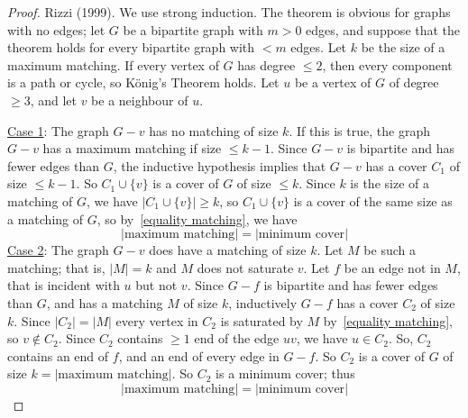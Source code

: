 \begin{proof}
    Rizzi (1999). We use strong induction.
    The theorem is obvious for graphs with no edges; let $ G $
    be a bipartite graph with $ m>0 $ edges, and suppose that the theorem holds
    for every bipartite graph with $ <m $ edges. Let $ k $ be the size of a
    maximum matching. If every vertex of $ G $ has degree $ \leqslant 2 $, then every
    component is a path or cycle, so König's Theorem holds. Let $ u $ be a vertex of
    $ G $ of degree $ \geqslant 3 $, and let $ v $ be a neighbour of $ u $.

    \underline{Case 1}: The graph $ G-v $ has no matching of size $ k $. If this is true,
    the graph $ G-v $ has a maximum matching if size $ \leqslant k-1 $. Since $ G-v $
    is bipartite and has fewer edges than $ G $, the inductive hypothesis implies that
    $ G-v $ has a cover $ C_1 $ of size $ \leqslant k-1 $. So $ C_1\cup \{v\} $
    is a cover of $ G $ of size $ \leqslant k $. Since $ k $ is the size of a matching of
    $ G $, we have $ |C_1\cup \{v\}|\geqslant k $, so $ C_1 \cup \{v\} $ is a cover
    of the same size as a matching of $ G $, so by~\ref{equality matching},
    we have
    \[ |\text{maximum matching}|=|\text{minimum cover}| \]
    \underline{Case 2}: The graph $ G-v $ does have a matching of size $ k $. Let
    $ M $ be such a matching; that is, $ |M|=k $ and $ M $ does not saturate $ v $.
    Let $ f $ be an edge not in $ M $, that is incident with $ u $ but not $ v $.
    Since $ G-f $ is bipartite and has fewer edges than $ G $, and has a matching $ M $
    of size $ k $, inductively $ G-f $ has a cover $ C_2 $ of size $ k $. Since
    $ |C_2|=|M| $ every vertex in $ C_2 $ is saturated by $ M $ by~\ref{equality matching},
    so $ v\notin C_2 $. Since $ C_2 $ contains $ \geqslant 1 $ end of the edge $ uv $,
    we have $ u\in C_2 $. So, $ C_2 $ contains an end of $ f $, and an end of every edge in
    $ G-f $. So $ C_2 $ is a cover of $ G $ of size $ k = |\text{maximum matching}| $.
    So $ C_2 $ is a minimum cover; thus
    \[ |\text{maximum matching}|=|\text{minimum cover}| \]
\end{proof}
